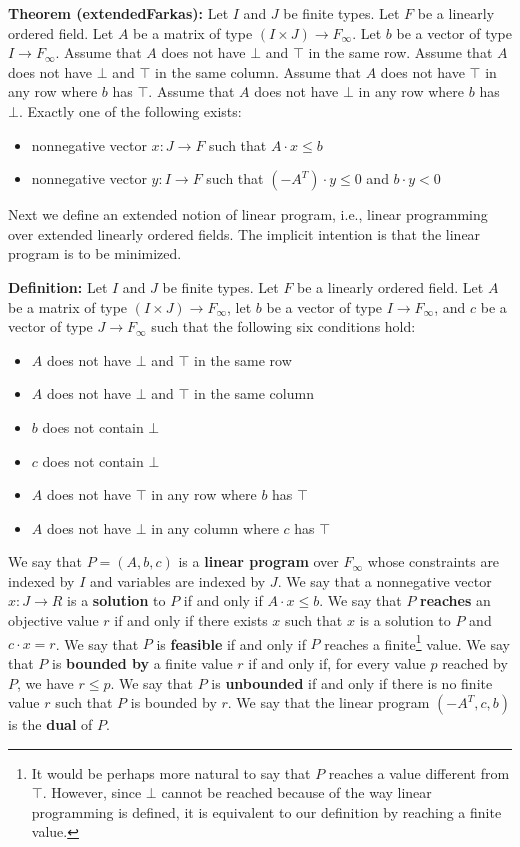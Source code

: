 \documentclass[]{article}
\renewcommand{\.}{\hskip .75pt}
\let\r=\rightarrow
\let\*=\cdot
\begin{document}
\medskip \noindent
\textbf{Theorem (extendedFarkas):}
Let $I$ and $J$ be finite types.
Let $F$ be a linearly ordered field.
Let $A$ be a matrix of type $(I \times J) \r F_\infty$.
Let $b$ be a vector of type $I \r F_\infty$.
Assume that $A$ does not have $\bot$ and $\top$ in the same row.
Assume that $A$ does not have $\bot$ and $\top$ in the same column.
Assume that $A$ does not have $\top$ in any row where $b$ has $\top$.
Assume that $A$ does not have $\bot$ in any row where $b$ has~$\bot$.
Exactly one of the following exists:
\begin{itemize}
\item nonnegative vector $x : J \r F$ such that $A \* x \le b$
\item nonnegative vector $y : I \r F$ such that $(-A^T) \* y \le 0$ and $b \* y < 0$
\end{itemize}
Next we define an extended notion of linear program, i.e.,
linear programming over extended linearly ordered fields.
The implicit intention is that the linear program is to be minimized.

\medskip \noindent
\textbf{Definition:}
Let $I$ and $J$ be finite types.
Let $F$ be a linearly ordered field.
Let $A$ be a matrix of type $(I \times J) \r F_\infty$,
let $b$ be a vector of type $I \r F_\infty$,
and $c$ be a vector of type $J \r F_\infty$
such that the following six conditions hold:
\begin{itemize}
\item $A$ does not have $\bot$ and $\top$ in the same row
\item $A$ does not have $\bot$ and $\top$ in the same column
\item $b$ does not contain $\bot$
\item $c$ does not contain $\bot$
\item $A$ does not have $\top$ in any row where $b$ has $\top$
\item $A$ does not have $\bot$ in any column where $c$ has $\top$
\end{itemize}
We say that $P = (A, b, c)$ is a \textbf{linear program} over $F_\infty$
whose constraints are indexed by $I$ and variables are indexed by $J$.
We say that a nonnegative vector $x : J \r R$ is
a \textbf{solution} to $P$ if and only if $A \* x \le b$.
We say that $P$ \textbf{reaches} an objective value $r$
if and only if there exists $x$ such that $x$ is a solution to $P$
and $c \* x = r$.
We say that $P$ is \textbf{feasible} if and only if $P$ reaches a finite\footnote{
It would be perhaps more natural to say that $P$ reaches a value different
from $\top$. However, since $\bot$ cannot be reached because of the way
linear programming is defined, it is equivalent to our definition by
reaching a finite value.} value.
We say that $P$ is \textbf{bounded by} a finite value $r$ if and only if,
for every value $p$ reached by $P$, we have $r \le p$.
We say that $P$ is \textbf{unbounded} if and only if there is no finite value $r$
such that $P$ is bounded by $r$.
We say that the linear program $(-A^T, c, b)$ is the \textbf{dual} of $P$.
\end{document}
